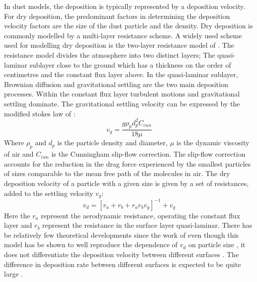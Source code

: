 In dust models, the deposition is typically represented by a deposition velocity. For dry deposition, the predominant factors in determining the deposition velocity factors are the size of the dust particle and the density. Dry deposition is commonly modelled by a multi-layer resistance scheme. A widely used scheme used for modelling dry deposition is the two-layer resistance model of \parencite{slinn1982predictions}. The resistance model divides the atmosphere into two distinct layers; The quasi-laminar sublayer close to the ground which has a thickness on the order of centimetres and the constant flux layer above. In the quasi-laminar sublayer, Brownian diffusion and gravitational settling are the two main deposition processes. Within the constant flux layer turbulent motions and gravitational settling dominate. The gravitational settling velocity can be expressed by the modified stokes law of \parencite{slinn1982predictions}: 
\begin{equation}
    v_g = \frac{g\rho_p d_p^2 C_{cun}}{18\mu}
\end{equation}
Where $\rho_p$ and $d_p$ is the particle density and diameter, $\mu$ is the dynamic viscosity of air and $C_{cun}$ is the Cunningham slip-flow correction. The slip-flow correction accounts for the reduction in the drag force experienced by the smallest particles of sizes comparable to the mean free path of the molecules in air. The dry deposition velocity of a particle with a given size is given by a set of resistances, added to the settling velocity $v_g$:
\begin{equation}\label{eq:drydep_resistance}
    v_d=[r_a + r_b + r_a r_b v_g]^{-1} + v_g
\end{equation}
Here the $r_a$ represent the aerodynamic resistance, operating the constant flux layer and $r_b$ represent the resistance in the  surface layer quasi-laminar. There has be relatively few theoretical developments since the work of \textcite{slinn1982predictions} even though this model has be shown to well reproduce the dependence of $v_d$ on particle size , it does not differentiate the deposition velocity between different surfaces \parencite{shao2011dust}. The difference in deposition rate between different surfaces is expected to be quite large . 

